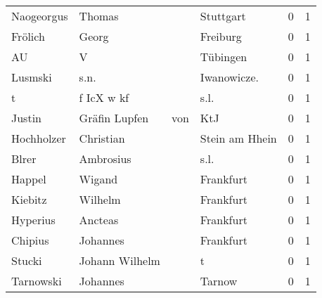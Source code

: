 \begin{center}
\begin{tiny}
\begin{longtabu}{llllrr}
               Naogeorgus &                             Thomas &             &                                   Stuttgart &          0 &         1 \\
                  Frölich &                              Georg &             &                                    Freiburg &          0 &         1 \\
                       AU &                                  V &             &                                    Tübingen &          0 &         1 \\
                  Lusmski &                               s.n. &             &                                Iwanowicze.  &          0 &         1 \\
                        t &                         f IcX w kf &             &                                        s.l. &          0 &         1 \\
                   Justin &                     Gräfin  Lupfen &         von &                                         KtJ &          0 &         1 \\
               Hochholzer &                          Christian &             &                              Stein am Hhein &          0 &         1 \\
                    Blrer &                          Ambrosius &             &                                        s.l. &          0 &         1 \\
                   Happel &                             Wigand &             &                                   Frankfurt &          0 &         1 \\
                  Kiebitz &                            Wilhelm &             &                                   Frankfurt &          0 &         1 \\
                 Hyperius &                            Ancteas &             &                                   Frankfurt &          0 &         1 \\
                  Chipius &                           Johannes &             &                                   Frankfurt &          0 &         1 \\
                   Stucki &                     Johann Wilhelm &             &                                           t &          0 &         1 \\
                Tarnowski &                           Johannes &             &                                      Tarnow &          0 &         1 \\

\end{longtabu}
\end{tiny}
\end{center}
